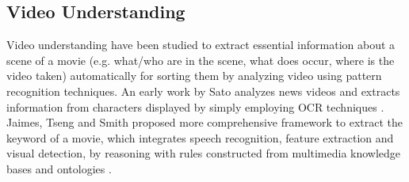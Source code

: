 \subsection{Video Understanding}

Video understanding have been studied to extract essential information about a scene of a movie (e.g. what/who are in the scene, what does occur, where is the video taken) automatically for sorting them by analyzing video using pattern recognition techniques.
An early work by Sato analyzes news videos and extracts information from characters displayed by simply employing OCR techniques \cite{sato1998video}.
Jaimes, Tseng and Smith proposed more comprehensive framework to extract the keyword of a movie, which integrates speech recognition, feature extraction and visual detection, by reasoning with rules constructed from multimedia knowledge bases and ontologies \cite{jaimes2003modal}.

